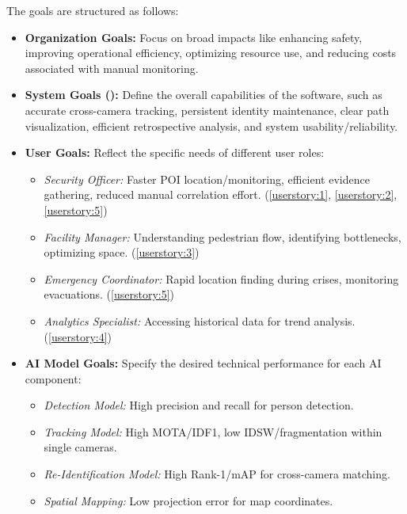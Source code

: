 The goals are structured as follows:
\begin{itemize}
    \item \textbf{Organization Goals:} Focus on broad impacts like enhancing safety, improving operational efficiency, optimizing resource use, and reducing costs associated with manual monitoring.
    \item \textbf{System Goals (\usevar{\srsTitle}):} Define the overall capabilities of the software, such as accurate cross-camera tracking, persistent identity maintenance, clear path visualization, efficient retrospective analysis, and system usability/reliability.
    \item \textbf{User Goals:} Reflect the specific needs of different user roles:
        \begin{itemize}
            \item \textit{Security Officer:} Faster POI location/monitoring, efficient evidence gathering, reduced manual correlation effort. (\ref{userstory:1}, \ref{userstory:2}, \ref{userstory:5})
            \item \textit{Facility Manager:} Understanding pedestrian flow, identifying bottlenecks, optimizing space. (\ref{userstory:3})
            \item \textit{Emergency Coordinator:} Rapid location finding during crises, monitoring evacuations. (\ref{userstory:5})
            \item \textit{Analytics Specialist:} Accessing historical data for trend analysis. (\ref{userstory:4})
        \end{itemize}
    \item \textbf{AI Model Goals:} Specify the desired technical performance for each AI component:
        \begin{itemize}
            \item \textit{Detection Model:} High precision and recall for person detection.
            \item \textit{Tracking Model:} High MOTA/IDF1, low IDSW/fragmentation within single cameras.
            \item \textit{Re-Identification Model:} High Rank-1/mAP for cross-camera matching.
            \item \textit{Spatial Mapping:} Low projection error for map coordinates.
        \end{itemize}
\end{itemize}

